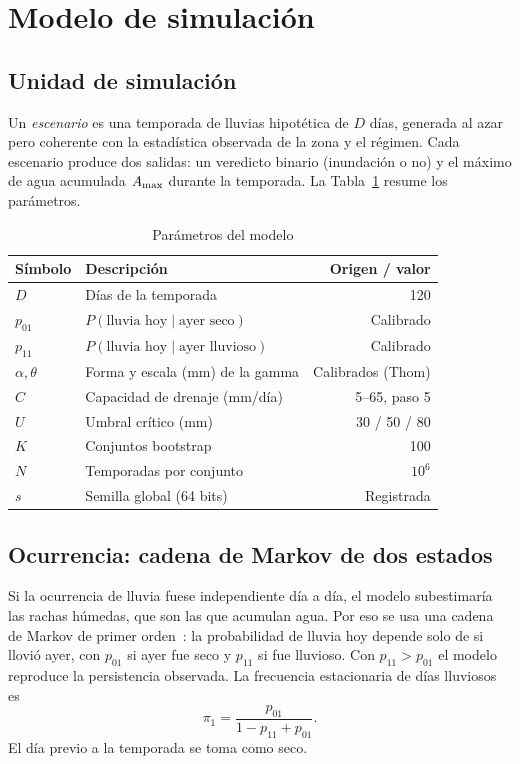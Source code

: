 \section{Modelo de simulación}
\label{sec:modelo}

\subsection{Unidad de simulación}

Un \emph{escenario} es una temporada de lluvias hipotética de $D$ días, generada al azar pero coherente con la estadística observada de la zona y el régimen. Cada escenario produce dos salidas: un veredicto binario (inundación o no) y el máximo de agua acumulada $A_{\max}$ durante la temporada. La Tabla~\ref{tab:parametros} resume los parámetros.

\begin{table}[!t]
\centering
\caption{Parámetros del modelo}
\label{tab:parametros}
\begin{tabular}{@{}llr@{}}
\toprule
Símbolo & Descripción & Origen / valor \\
\midrule
$D$ & Días de la temporada & 120 \\
$p_{01}$ & $P(\text{lluvia hoy} \mid \text{ayer seco})$ & Calibrado \\
$p_{11}$ & $P(\text{lluvia hoy} \mid \text{ayer lluvioso})$ & Calibrado \\
$\alpha,\theta$ & Forma y escala (mm) de la gamma & Calibrados (Thom) \\
$C$ & Capacidad de drenaje (mm/día) & 5--65, paso 5 \\
$U$ & Umbral crítico (mm) & 30 / 50 / 80 \\
$K$ & Conjuntos bootstrap & 100 \\
$N$ & Temporadas por conjunto & $10^{6}$ \\
$s$ & Semilla global (64 bits) & Registrada \\
\bottomrule
\end{tabular}
\end{table}

\subsection{Ocurrencia: cadena de Markov de dos estados}

Si la ocurrencia de lluvia fuese independiente día a día, el modelo subestimaría las rachas húmedas, que son las que acumulan agua. Por eso se usa una cadena de Markov de primer orden~\cite{richardson1981,wilks2011}: la probabilidad de lluvia hoy depende solo de si llovió ayer, con $p_{01}$ si ayer fue seco y $p_{11}$ si fue lluvioso. Con $p_{11} > p_{01}$ el modelo reproduce la persistencia observada. La frecuencia estacionaria de días lluviosos es
\begin{equation}
\pi_1 = \frac{p_{01}}{1 - p_{11} + p_{01}}.
\label{eq:estacionaria}
\end{equation}
El día previo a la temporada se toma como seco.

